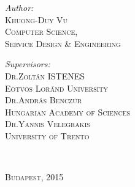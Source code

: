 \documentclass[a4paper,12pt,times,numbered,print,index]{Classes/PhDThesisPSnPDF}
\begin{document}
\begin{titlepage}
\begin{center}
		\begin{minipage}{0.43\textwidth}
			\begin{flushleft} \large	
				\emph{Author:}\\
				\textsc{Khuong-Duy Vu \\ \small Computer Science, \\\hspace{0cm}Service Design \& Engineering  \\\hspace{0cm}} %
			\end{flushleft}
		\end{minipage}
		\begin{minipage}{0.56\textwidth}
			\begin{flushright} \large
				\emph{Supervisors:} \\
				\textsc{Dr.Zoltán ISTENES \\ \small Eötvös Loránd University\\[0.3cm] }
				\textsc{Dr.András Benczúr \\ \small Hungarian Academy of Sciences\\[0.3cm] }
				\textsc{Dr.Yannis Velegrakis \\ \small University of Trento\\[0.3cm] }
				
			\end{flushright}
		\end{minipage}\\[1cm]
		
			\begin{minipage}{0.37\textwidth}
				\begin{flushleft} \large	
					
				\end{flushleft}
			\end{minipage}
			
			
		\textsc{{\large Budapest, 2015}}\\[4cm] 
		
		\vfill
	\end{center}
	
\end{titlepage}





%
%
%
%
\end{document}
